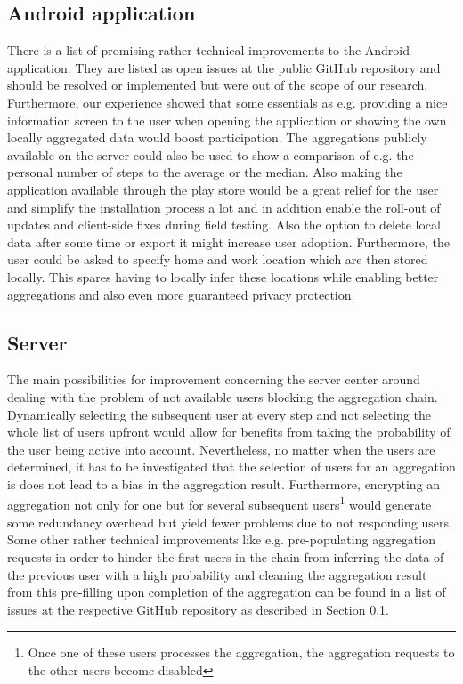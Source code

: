 \subsection{Android application}\label{future-android}
There is a list of promising rather technical improvements to the Android application. They are listed as open issues at the public GitHub repository and should be resolved or implemented but were out of the scope of our research. Furthermore, our experience showed that some essentials as e.g. providing a nice information screen to the user when opening the application or showing the own locally aggregated data would boost participation. The aggregations publicly available on the server could also be used to show a comparison of e.g. the personal number of steps to the average or the median. Also making the application available through the play store would be a great relief for the user and simplify the installation process a lot and in addition enable the roll-out of updates and client-side fixes during field testing. Also the option to delete local data after some time or export it might increase user adoption. Furthermore, the user could be asked to specify home and work location which are then stored locally. This spares having to locally infer these locations while enabling better aggregations and also even more guaranteed privacy protection.

\subsection{Server}
The main possibilities for improvement concerning the server center around dealing with the problem of not available users blocking the aggregation chain. Dynamically selecting the subsequent user at every step and not selecting the whole list of users upfront would allow for benefits from taking the probability of the user being active into account. Nevertheless, no matter when the users are determined, it has to be investigated that the selection of users for an aggregation is does not lead to a bias in the aggregation result. Furthermore, encrypting an aggregation not only for one but for several subsequent users\footnote{Once one of these users processes the aggregation, the aggregation requests to the other users become disabled} would generate some redundancy overhead but yield fewer problems due to not responding users.
Some other rather technical improvements like e.g. pre-populating aggregation requests in order to hinder the first users in the chain from inferring the data of the previous user with a high probability and cleaning the aggregation result from this pre-filling upon completion of the aggregation can be found in a list of issues at the respective GitHub repository as described in Section \ref{future-android}.

